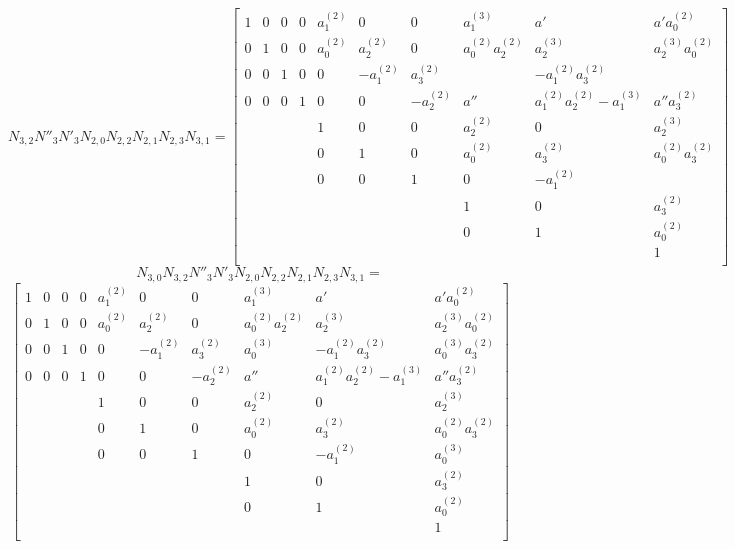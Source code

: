 \documentclass{article}
\begin{document}
\[
N_{3,2}N''_3N'_3N_{2,0}N_{2,2}N_{2,1}N_{2,3}N_{3,1}=
  \begin{bmatrix}
    1 & 0 & 0 & 0 & a_1^{(2)} & 0 & 0 & a_1^{(3)} & a' & a'a_0^{(2)} \\
    0 & 1 & 0 & 0 & a_0^{(2)} & a_2^{(2)} & 0 & a_0^{(2)}a_2^{(2)} & a_2^{(3)} & a_2^{(3)}a_0^{(2)} \\
    0 & 0 & 1 & 0 & 0 & -a_1^{(2)} & a_3^{(2)} &  & -a_1^{(2)}a_3^{(2)} &  \\
    0 & 0 & 0 & 1 & 0 & 0 & -a_2^{(2)} & a'' & a_1^{(2)}a_2^{(2)}-a_1^{(3)} & a''a_3^{(2)} \\
    & & & & 1 & 0 & 0 & a_2^{(2)} & 0 & a_2^{(3)} \\
    & & & & 0 & 1 & 0 & a_0^{(2)} & a_3^{(2)} & a_0^{(2)}a_3^{(2)}\\
    & & & & 0 & 0 & 1 & 0 & -a_1^{(2)} &  \\
    & & & & & & & 1 & 0 & a_3^{(2)} \\
    & & & & & & & 0 & 1 & a_0^{(2)} \\
    & & & & & & & & & 1 \\
  \end{bmatrix}
\]
\newpage
\[
N_{3,0}N_{3,2}N''_3N'_3N_{2,0}N_{2,2}N_{2,1}N_{2,3}N_{3,1}=\]\[
  \begin{bmatrix}
    1 & 0 & 0 & 0 & a_1^{(2)} & 0 & 0 & a_1^{(3)} & a' & a'a_0^{(2)} \\
    0 & 1 & 0 & 0 & a_0^{(2)} & a_2^{(2)} & 0 & a_0^{(2)}a_2^{(2)} & a_2^{(3)} & a_2^{(3)}a_0^{(2)} \\
    0 & 0 & 1 & 0 & 0 & -a_1^{(2)} & a_3^{(2)} & a_0^{(3)} & -a_1^{(2)}a_3^{(2)} & a_0^{(3)}a_3^{(2)} \\
    0 & 0 & 0 & 1 & 0 & 0 & -a_2^{(2)} & a'' & a_1^{(2)}a_2^{(2)}-a_1^{(3)} & a''a_3^{(2)} \\
    & & & & 1 & 0 & 0 & a_2^{(2)} & 0 & a_2^{(3)} \\
    & & & & 0 & 1 & 0 & a_0^{(2)} & a_3^{(2)} & a_0^{(2)}a_3^{(2)}\\
    & & & & 0 & 0 & 1 & 0 & -a_1^{(2)} & a_0^{(3)} \\
    & & & & & & & 1 & 0 & a_3^{(2)} \\
    & & & & & & & 0 & 1 & a_0^{(2)} \\
    & & & & & & & & & 1 \\
  \end{bmatrix}
\]
\end{document}
